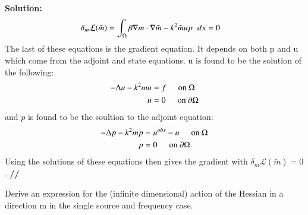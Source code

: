 \documentclass[11pt]{article}
\newenvironment{solution}{\begin{trivlist}\item[]{\bf Solution:}}
                      {\textbf{//} \end{trivlist}}
\begin{document}
\begin{enumerate}
\begin{solution}
\begin{align}
\delta_m\mathcal{L}(\tilde{m}) &= \int_{\Omega} \beta \nabla m \cdot
 \nabla\tilde{m} - k^2\tilde{m}up \hspace{2 mm} dx = 0 \nonumber 
\end{align}
The last of these equations is the gradient equation. It depends
 on both p and u which come from the adjoint and state
 equations. u is found to be the solution of the
 following: 
\begin{align}
-\Delta u - k^2mu &= f\hspace{5 mm} \text{on } \Omega \nonumber \\
u &= 0 \hspace{5 mm} \text{on } \partial\Omega \nonumber
\end{align}
and $p$ is found to be the soultion to the adjoint equation:
\begin{align}
-\Delta p - k^2mp &= u^{obs} - u \hspace{5 mm} \text{on } \Omega \nonumber \\
p &= 0 \hspace{5 mm} \text{on } \partial\Omega \nonumber.
\end{align}
Using the solutions of these equations then gives the gradient with
 $\delta_m\mathcal{L}(\tilde{m}) = 0$. 
\end{solution}

\item[(b)] Derive an expression for the (infinite dimensional) action of
	   the Hessian in a direction m in the single source and frequency case.


\end{enumerate}
\end{document}
